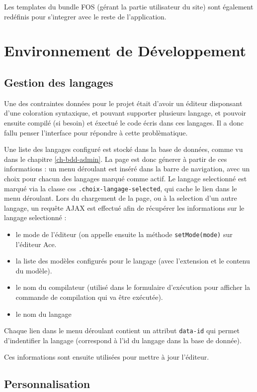 Les templates du bundle FOS (gérant la partie utilisateur du site) sont également redéfinis pour s'integrer avec le reste de l'application.

\section{Environnement de Développement}

\subsection{Gestion des langages}

Une des contraintes données pour le projet était d'avoir un éditeur disponsant d'une coloration syntaxique, et pouvant supporter plusieurs langage, et pouvoir ensuite compilé (si besoin) et éxectué le code écris dans ces langages. Il a donc fallu penser l'interface pour répondre à cette problèmatique.

Une liste des langages configuré est stocké dans la base de données, comme vu dans le chapitre \ref{ch-bdd-admin}. La page est donc génerer à partir de ces informations : un menu déroulant est inséré dans la barre de navigation, avec un choix pour chacun des langages marqué comme actif. Le langage selectionné est marqué via la classe css \texttt{.choix-langage-selected}, qui cache le lien dans le menu déroulant. Lors du chargement de la page, ou à la selection d'un autre langage, un requête AJAX est effectué afin de récupérer les informations sur le langage selectionné :
\begin{itemize}
  \item le mode de l'éditeur (on appelle ensuite la méthode \texttt{setMode(mode)} sur l'éditeur Ace.
  \item la liste des modèles configurés pour le langage (avec l'extension et le contenu du modèle).
  \item le nom du compilateur (utilisé dans le formulaire d'exécution pour afficher la commande de compilation qui va être exécutée).
  \item le nom du langage
\end{itemize}
Chaque lien dans le menu déroulant contient un attribut \texttt{data-id} qui permet d'indentifier la langage (correspond à l'id du langage dans la base de donnée).

Ces informations sont ensuite utilisées pour mettre à jour l'éditeur.

\subsection{Personnalisation}

